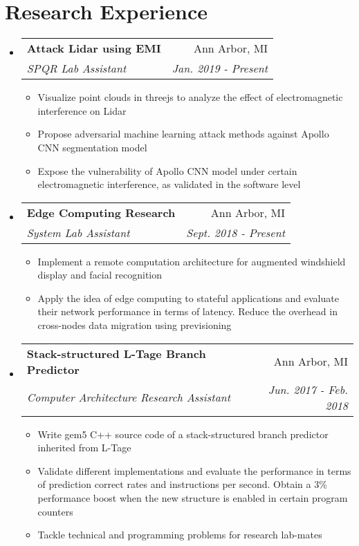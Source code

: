 \documentclass[letterpaper,10pt]{article}
\makeatletter
\newcommand{\resumeSubheading}[5]{
      \vspace{-1pt}\item
        \begin{tabular*}{0.97\textwidth}{l@{\extracolsep{\fill}}r}
          \textbf{#1} & #2 \\
          \textit{\small#3} & \textit{\small #4} \\
        \end{tabular*}\vspace{#5 pt}
    }
\newcommand{\resumeSubHeadingListStart}{\begin{itemize}[leftmargin=*]}
\newcommand{\resumeSubHeadingListEnd}{\end{itemize}}
\makeatother
\begin{document}
    \section{\faShoppingBag Research Experience}
    \resumeSubHeadingListStart
    \resumeSubheading
    {Attack Lidar using EMI}{Ann Arbor, MI}
    {SPQR Lab Assistant}{Jan. 2019 - Present}{-5}
    \begin{itemize}
      \item Visualize point clouds in threejs to analyze the effect of electromagnetic interference on Lidar
      \item Propose adversarial machine learning attack methods against Apollo CNN segmentation model
      \item Expose the vulnerability of Apollo CNN model under certain electromagnetic interference, as validated in the software level
    \end{itemize}


    \resumeSubheading
    {Edge Computing Research}{Ann Arbor, MI}
    {System Lab Assistant}{Sept. 2018 - Present}{-5}
    \begin{itemize}
      \item Implement a remote computation architecture for augmented windshield display and facial recognition
      \item Apply the idea of edge computing to stateful applications and evaluate their network performance in terms of latency. Reduce the overhead in cross-nodes data migration using previsioning
    \end{itemize}

    \resumeSubheading
    {Stack-structured L-Tage Branch Predictor}{Ann Arbor, MI}
    {Computer Architecture Research Assistant}{Jun. 2017 - Feb. 2018}{-5}
    \begin{itemize}
      \item Write gem5 C++ source code of a stack-structured branch predictor inherited from L-Tage
      \item Validate different implementations and evaluate the performance in terms of prediction correct rates and instructions per second. Obtain a 3\% performance boost when the new structure is enabled in certain program counters
      \item Tackle technical and programming problems for research lab-mates
    \end{itemize}
    \resumeSubHeadingListEnd

 

\end{document}
